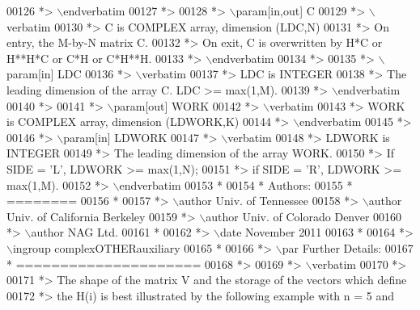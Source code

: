 \begin{DoxyCode}
00126 \textcolor{comment}{*> \(\backslash\)endverbatim}
00127 \textcolor{comment}{*>}
00128 \textcolor{comment}{*> \(\backslash\)param[in,out] C}
00129 \textcolor{comment}{*> \(\backslash\)verbatim}
00130 \textcolor{comment}{*>          C is COMPLEX array, dimension (LDC,N)}
00131 \textcolor{comment}{*>          On entry, the M-by-N matrix C.}
00132 \textcolor{comment}{*>          On exit, C is overwritten by H*C or H**H*C or C*H or C*H**H.}
00133 \textcolor{comment}{*> \(\backslash\)endverbatim}
00134 \textcolor{comment}{*>}
00135 \textcolor{comment}{*> \(\backslash\)param[in] LDC}
00136 \textcolor{comment}{*> \(\backslash\)verbatim}
00137 \textcolor{comment}{*>          LDC is INTEGER}
00138 \textcolor{comment}{*>          The leading dimension of the array C. LDC >= max(1,M).}
00139 \textcolor{comment}{*> \(\backslash\)endverbatim}
00140 \textcolor{comment}{*>}
00141 \textcolor{comment}{*> \(\backslash\)param[out] WORK}
00142 \textcolor{comment}{*> \(\backslash\)verbatim}
00143 \textcolor{comment}{*>          WORK is COMPLEX array, dimension (LDWORK,K)}
00144 \textcolor{comment}{*> \(\backslash\)endverbatim}
00145 \textcolor{comment}{*>}
00146 \textcolor{comment}{*> \(\backslash\)param[in] LDWORK}
00147 \textcolor{comment}{*> \(\backslash\)verbatim}
00148 \textcolor{comment}{*>          LDWORK is INTEGER}
00149 \textcolor{comment}{*>          The leading dimension of the array WORK.}
00150 \textcolor{comment}{*>          If SIDE = 'L', LDWORK >= max(1,N);}
00151 \textcolor{comment}{*>          if SIDE = 'R', LDWORK >= max(1,M).}
00152 \textcolor{comment}{*> \(\backslash\)endverbatim}
00153 \textcolor{comment}{*}
00154 \textcolor{comment}{*  Authors:}
00155 \textcolor{comment}{*  ========}
00156 \textcolor{comment}{*}
00157 \textcolor{comment}{*> \(\backslash\)author Univ. of Tennessee }
00158 \textcolor{comment}{*> \(\backslash\)author Univ. of California Berkeley }
00159 \textcolor{comment}{*> \(\backslash\)author Univ. of Colorado Denver }
00160 \textcolor{comment}{*> \(\backslash\)author NAG Ltd. }
00161 \textcolor{comment}{*}
00162 \textcolor{comment}{*> \(\backslash\)date November 2011}
00163 \textcolor{comment}{*}
00164 \textcolor{comment}{*> \(\backslash\)ingroup complexOTHERauxiliary}
00165 \textcolor{comment}{*}
00166 \textcolor{comment}{*> \(\backslash\)par Further Details:}
00167 \textcolor{comment}{*  =====================}
00168 \textcolor{comment}{*>}
00169 \textcolor{comment}{*> \(\backslash\)verbatim}
00170 \textcolor{comment}{*>}
00171 \textcolor{comment}{*>  The shape of the matrix V and the storage of the vectors which define}
00172 \textcolor{comment}{*>  the H(i) is best illustrated by the following example with n = 5 and}

\end{DoxyCode}
